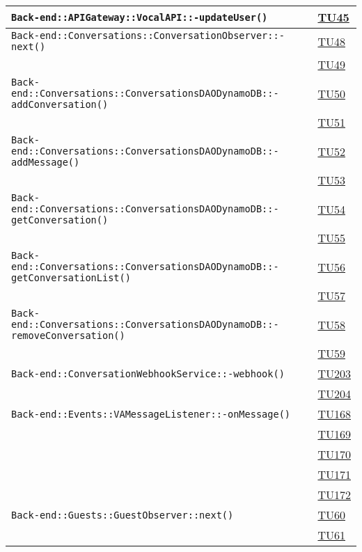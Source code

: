 \begin{longtable}{|>{\centering}m{12cm}|m{1cm}<{\centering}|}
\texttt{Back-end::APIGateway::VocalAPI::-\linebreak updateUser()} & \hyperlink{TU45}{TU45}\\ \hline
\texttt{Back-end::Conversations::ConversationObserver::-\linebreak next()} & \hyperlink{TU48}{TU48}\\ & \hyperlink{TU49}{TU49}\\ \hline
\texttt{Back-end::Conversations::ConversationsDAODynamoDB::-\linebreak addConversation()} & \hyperlink{TU50}{TU50}\\ & \hyperlink{TU51}{TU51}\\ \hline
\texttt{Back-end::Conversations::ConversationsDAODynamoDB::-\linebreak addMessage()} & \hyperlink{TU52}{TU52}\\ & \hyperlink{TU53}{TU53}\\ \hline
\texttt{Back-end::Conversations::ConversationsDAODynamoDB::-\linebreak getConversation()} & \hyperlink{TU54}{TU54}\\ & \hyperlink{TU55}{TU55}\\ \hline
\texttt{Back-end::Conversations::ConversationsDAODynamoDB::-\linebreak getConversationList()} & \hyperlink{TU56}{TU56}\\ & \hyperlink{TU57}{TU57}\\ \hline
\texttt{Back-end::Conversations::ConversationsDAODynamoDB::-\linebreak removeConversation()} & \hyperlink{TU58}{TU58}\\ & \hyperlink{TU59}{TU59}\\ \hline
\texttt{Back-end::ConversationWebhookService::-\linebreak webhook()} & \hyperlink{TU203}{TU203}\\ & \hyperlink{TU204}{TU204}\\ \hline
\texttt{Back-end::Events::VAMessageListener::-\linebreak onMessage()} & \hyperlink{TU168}{TU168}\\ & \hyperlink{TU169}{TU169}\\ & \hyperlink{TU170}{TU170}\\ & \hyperlink{TU171}{TU171}\\ & \hyperlink{TU172}{TU172}\\ \hline
\texttt{Back-end::Guests::GuestObserver::next()} & \hyperlink{TU60}{TU60}\\ & \hyperlink{TU61}{TU61}\\ \hline

\end{longtable}
